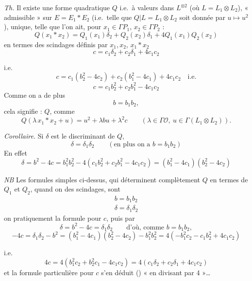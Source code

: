 \documentclass[11pt,a4paper]{article}
\begin{document}
\emph{Th.} Il existe une forme quadratique $Q$ i.e.\ à valeurs dans $L^{\otimes 2}$ (où $L = L_1 \otimes L_2$), « admissible » sur $E = E_1 * E_2$ (i.e.\ telle que $Q | L = L_1 \otimes L_2$ soit donnée par $u \mapsto u^2$), unique, telle que l'on ait, pour $x_1 \in \Gamma P_1$, $x_2 \in \Gamma P_2$  :
\[
  \boxed{Q(x_1 * x_2) = Q_1(x_1) \delta_2 + Q_2(x_2) \delta_1 + 4 Q_1(x_1) Q_2(x_2)}
\]
en termes des scindages définis par $x_1, x_2$,  $x_1 * x_2$
\[
  \boxed{c = c_1 \delta_2 + c_2 \delta_1 + 4 c_1 c_2}
\]

i.e.
\[
  c = c_1 (b_2^2 - 4c_2) + c_2 (b_1^2 - 4c_1) + 4 c_1 c_2 \quad \text{i.e.}
\]
\[
  \boxed{c = c_1 b_2^2 + c_2 b_1^2 - 4 c_1 c_2}
\]
Comme on a de plus
\[
  \boxed{b = b_1 b_2} ,
\]
cela signifie :  $Q$, comme
\[
  Q(\lambda\, x_1 * x_2 + u) = u^2 + \lambda b u + \lambda^2 c
  \qquad (\lambda \in \Gamma \mathcal{O} ,\ u \in \Gamma(L_1 \otimes L_2)) .
\]

\emph{Corollaire.} Si $\delta$ est le discriminant de $Q$,
\[
  \delta = \delta_1 \delta_2 \qquad (\text{en plus on a } b = b_1 b_2)
\]
En effet
\[
  \delta = b^2 - 4c = b_1^2 b_2^2 - 4(c_1 b_2^2 + c_2 b_1^2 - 4 c_1 c_2) = (b_1^2 - 4c_1)(b_2^2 - 4c_2)
\]

\emph{NB} Les formules simples ci-dessus, qui déterminent complètement $Q$ en termes de $Q_1$ et $Q_2$, quand on \ill{} des scindages, sont
\[
  \boxed{\begin{array}{l} b = b_1 b_2 \\ \delta = \delta_1 \delta_2 \end{array}}
\]
 on  pratiquement la formule pour $c$, puis par
\[
  \delta = b^2 - 4c = \delta_1 \delta_2 \qquad \text{d'où, comme } b = b_1 b_2 ,
\]
\[
  -4c = \delta_1 \delta_2 - b^2 = (b_1^2 - 4c_1)(b_2^2 - 4c_2) - b_1^2 b_2^2 = 4(-b_1^2 c_2 - c_1 b_2^2 + 4 c_1 c_2)
\]

i.e.
\[
  4c = 4(b_1^2 c_2 + b_2^2 c_1 - 4 c_1 c_2) = 4(c_1 \delta_2 + c_2 \delta_1 + 4 c_1 c_2)
\]
et la formule particulière pour $c$ s'en déduit () « en divisant par 4 »…
\end{document}
